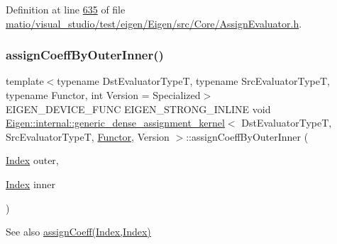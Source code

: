 Definition at line \hyperlink{matio_2visual__studio_2test_2eigen_2_eigen_2src_2_core_2_assign_evaluator_8h_source_l00635}{635} of file \hyperlink{matio_2visual__studio_2test_2eigen_2_eigen_2src_2_core_2_assign_evaluator_8h_source}{matio/visual\+\_\+studio/test/eigen/\+Eigen/src/\+Core/\+Assign\+Evaluator.\+h}.

\mbox{\label{class_eigen_1_1internal_1_1generic__dense__assignment__kernel_aff1bc113e270d4f895ca90570536303b}} 
\subsubsection{\texorpdfstring{assign\+Coeff\+By\+Outer\+Inner()}{assignCoeffByOuterInner()}\hspace{0.1cm}{\footnotesize\ttfamily [1/2]}}
{\footnotesize\ttfamily template$<$typename Dst\+Evaluator\+TypeT, typename Src\+Evaluator\+TypeT, typename Functor, int Version = Specialized$>$ \\
E\+I\+G\+E\+N\+\_\+\+D\+E\+V\+I\+C\+E\+\_\+\+F\+U\+NC E\+I\+G\+E\+N\+\_\+\+S\+T\+R\+O\+N\+G\+\_\+\+I\+N\+L\+I\+NE void \hyperlink{class_eigen_1_1internal_1_1generic__dense__assignment__kernel}{Eigen\+::internal\+::generic\+\_\+dense\+\_\+assignment\+\_\+kernel}$<$ Dst\+Evaluator\+TypeT, Src\+Evaluator\+TypeT, \hyperlink{struct_functor}{Functor}, Version $>$\+::assign\+Coeff\+By\+Outer\+Inner (\begin{DoxyParamCaption}\item[{\hyperlink{namespace_eigen_a62e77e0933482dafde8fe197d9a2cfde}{Index}}]{outer,  }\item[{\hyperlink{namespace_eigen_a62e77e0933482dafde8fe197d9a2cfde}{Index}}]{inner }\end{DoxyParamCaption})\hspace{0.3cm}{\ttfamily [inline]}}

\begin{DoxySeeAlso}{See also}
\hyperlink{class_eigen_1_1internal_1_1generic__dense__assignment__kernel_a7ca974cc4049f1ef3d6f2feac94ea35b}{assign\+Coeff(\+Index,\+Index)} 
\end{DoxySeeAlso}


